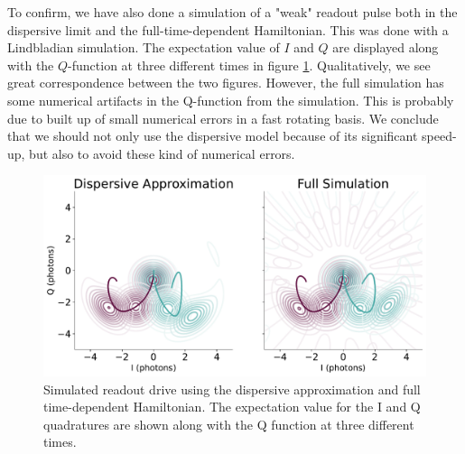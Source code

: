 To confirm, we have also done a simulation of a "weak" readout pulse both in the dispersive limit and the full-time-dependent Hamiltonian. This was done with a Lindbladian simulation. The expectation value of $I$ and $Q$ are displayed along with the $Q$-function at three different times in figure \ref{fig:dispersive_slash_full_readout}. Qualitatively, we see great correspondence between the two figures. However, the full simulation has some numerical artifacts in the Q-function from the simulation. This is probably due to built up of small numerical errors in a fast rotating basis. We conclude that we should not only use the dispersive model because of its significant speed-up, but also to avoid these kind of numerical errors.

\begin{figure}
    \centering
    \includegraphics[width = \textwidth]{Simulations/readout_simulations/figures/dispersive_approx.pdf}
    \caption{Simulated readout drive using the dispersive approximation and full time-dependent Hamiltonian. The expectation value for the I and Q quadratures are shown along with the Q function at three different times.}
    \label{fig:dispersive_slash_full_readout}
\end{figure}



